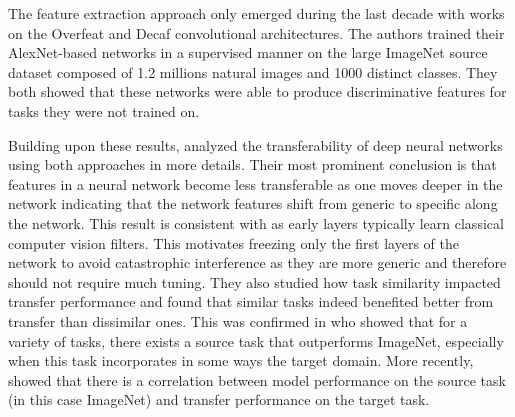 
The feature extraction approach only emerged during the last decade with works on the Overfeat
\cite{sermanet2013overfeat, razavian2014cnn} and Decaf \cite{donahue2014decaf}
convolutional architectures. The authors trained their AlexNet-based networks in
a supervised manner on the large ImageNet source dataset composed of 1.2 millions
natural images and 1000 distinct classes. They both showed that these networks
were able to produce discriminative features for tasks they were not trained on.

Building upon these results, \citeauthor{yosinski2014transferable} \cite{yosinski2014transferable} analyzed the
transferability of deep neural networks using both approaches in more details.
Their most prominent conclusion is that features in a neural network become less
transferable as one moves deeper in the network indicating that the network features
shift from generic to specific along the network. This result is consistent with
\citeauthor{zeiler2014visualizing} \cite{zeiler2014visualizing} as early layers typically learn classical computer
vision filters. This motivates freezing only the first layers of the network to
avoid catastrophic interference as they are more generic and therefore should not
require much tuning. They also studied how task similarity impacted transfer
performance and found that similar tasks indeed benefited better from transfer
than dissimilar ones. This was confirmed in \citeauthor{mensink2021factors} \cite{mensink2021factors} who 
showed that for a variety of tasks, there exists a source task that outperforms
ImageNet, especially when this task incorporates in some ways the target domain.
More recently, \citeauthor{kornblith2019better} \cite{kornblith2019better} showed that there is a correlation 
between model performance on the source task (in this case  ImageNet) and transfer 
performance on the target task. 

